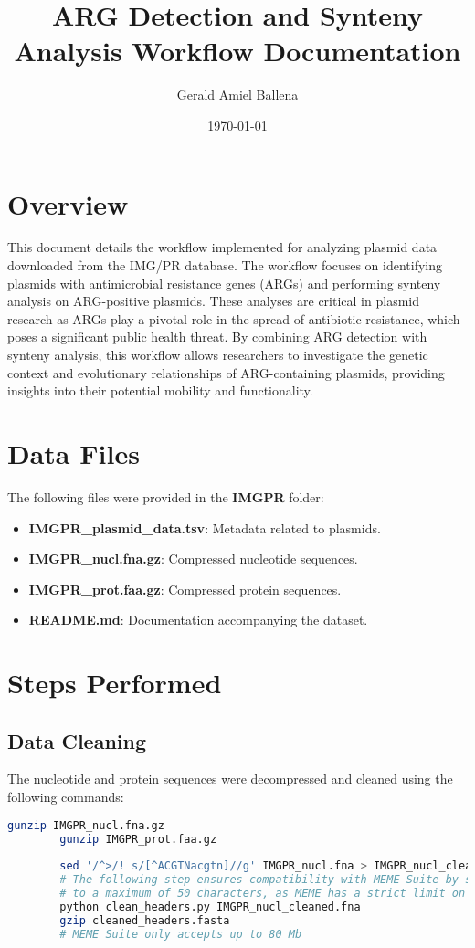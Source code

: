 \documentclass[a4paper,12pt]{report}
\title{ARG Detection and Synteny Analysis Workflow Documentation}
\author{Gerald Amiel Ballena}
\date{\today}
\begin{document}
	
	\maketitle
	
	\section*{Overview}
	This document details the workflow implemented for analyzing plasmid data downloaded from the IMG/PR database. The workflow focuses on identifying plasmids with antimicrobial resistance genes (ARGs) and performing synteny analysis on ARG-positive plasmids. These analyses are critical in plasmid research as ARGs play a pivotal role in the spread of antibiotic resistance, which poses a significant public health threat. By combining ARG detection with synteny analysis, this workflow allows researchers to investigate the genetic context and evolutionary relationships of ARG-containing plasmids, providing insights into their potential mobility and functionality.
	
	\section*{Data Files}
	The following files were provided in the \textbf{IMGPR} folder:
	\begin{itemize}
		\item \textbf{IMGPR\_plasmid\_data.tsv}: Metadata related to plasmids.
		\item \textbf{IMGPR\_nucl.fna.gz}: Compressed nucleotide sequences.
		\item \textbf{IMGPR\_prot.faa.gz}: Compressed protein sequences.
		\item \textbf{README.md}: Documentation accompanying the dataset.
	\end{itemize}
	
	\section*{Steps Performed}
	
	\subsection*{Data Cleaning}
	The nucleotide and protein sequences were decompressed and cleaned using the following commands:
	\begin{lstlisting}[language=bash]
		gunzip IMGPR_nucl.fna.gz
		gunzip IMGPR_prot.faa.gz
		
		sed '/^>/! s/[^ACGTNacgtn]//g' IMGPR_nucl.fna > IMGPR_nucl_cleaned.fna
		# The following step ensures compatibility with MEME Suite by shortening headers
		# to a maximum of 50 characters, as MEME has a strict limit on header length.
		python clean_headers.py IMGPR_nucl_cleaned.fna
		gzip cleaned_headers.fasta
		# MEME Suite only accepts up to 80 Mb
	\end{lstlisting}
	
\end{document}
